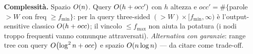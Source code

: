 \textbf{Complessit\`a.} Spazio $O\!\left(n\right)$. Query $O\!\left(h+occ'\right)$ con $h$ altezza e
$occ'=\#\{$parole $>W$ con freq $\ge f_{\min}\}$: per la query three-sided
$(>W)\times[f_{\min},\infty)$ \`e l'output-sensitive classico $O\!\left(h+occ\right)$; il vincolo $\le
f_{\max}$ non aiuta la potatura (i nodi troppo frequenti vanno comunque attraversati).
\emph{Alternativa con garanzie}: range tree con query $O\!\left(\log^2 n+occ\right)$ e spazio
$O\!\left(n\log n\right)$ --- da citare come trade-off.
